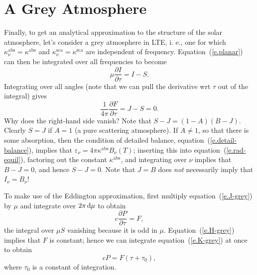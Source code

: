\section[Grey Atmosphere]{A Grey Atmosphere}

Finally, to get an analytical approximation to the structure of the solar atmosphere, let's consider a grey atmosphere in LTE, i. e., one for which $\kappa_{\nu}^{\mathrm{abs}} = \kappa^{\mathrm{abs}}$ and $\kappa_{\nu}^{\mathrm{sca}} = \kappa^{\mathrm{sca}}$ are independent of frequency. Equation~(\ref{e.planar}) can then be integrated over all frequencies to become
\begin{equation}\label{e.J-grey}
\mu\frac{\partial I}{\partial\tau} = I-S.
\end{equation}
Integrating over all angles (note that we can pull the derivative wrt $\tau$ out of the integral) gives
\begin{equation}\label{e.H-grey}
\frac{1}{4\pi}\frac{\partial F}{\partial\tau} = J - S = 0.
\end{equation}
Why does the right-hand side vanish? Note that $S-J = (1-A)(B-J)$.  Clearly $S = J$ if $A = 1$ (a pure scattering atmosphere).  If $A \ne 1$, so that there is some absorption, then the condition of detailed balance, equation~(\ref{e.detail-balance}), implies that $\varepsilon_{\nu} = 4\pi\kappa^{\mathrm{abs}}B_{\nu}(T)$; inserting this into equation~(\ref{e.rad-equil}), factoring out the constant $\kappa^{\mathrm{abs}}$, and integrating over $\nu$ implies that $B - J = 0$, and hence $S - J = 0$. Note that $J = B$ does \emph{not} necessarily imply that $I_{\nu} = B_{\nu}$!

To make use of the Eddington approximation, first multiply equation~(\ref{e.J-grey}) by $\mu$ and integrate over $2\pi\,\mathrm{d}\mu$ to obtain
\begin{equation}\label{e.K-grey}
c\frac{\partial P}{\partial\tau} = F,
\end{equation}
the integral over $\mu S$ vanishing because it is odd in $\mu$. Equation~(\ref{e.H-grey}) implies that $F$ is constant; hence we can integrate equation~(\ref{e.K-grey}) at once to obtain
\begin{equation}\label{e.KH}
cP = F(\tau + \tau_{0}),
\end{equation}
where $\tau_{0}$ is a constant of integration.

